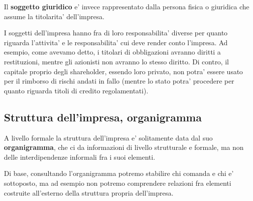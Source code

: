 \documentclass[a4paper,11pt]{article}
\begin{document}
Il \textbf{soggetto giuridico} e' invece rappresentato dalla persona fisica o giuridica che assume la titolarita' dell'impresa.

I soggetti dell'impresa hanno fra di loro responsabilita' diverse per quanto riguarda l'attivita' e le responsabilita' cui deve render conto l'impresa.
Ad esempio, come avevamo detto, i titolari di obbligazioni avranno diritti a restituzioni, mentre gli azionisti non avranno lo stesso diritto.
Di contro, il capitale proprio degli shareholder, essendo loro privato, non potra' essere usato per il rimborso di rischi andati in fallo (mentre lo stato potra' procedere per quanto riguarda titoli di credito regolamentati).

\subsection{Struttura dell'impresa, organigramma}
A livello formale la struttura dell'impresa e' solitamente data dal suo \textbf{organigramma}, che ci da informazioni di livello strutturale e formale, ma non delle interdipendenze informali fra i suoi elementi.
	
Di base, consultando l'organigramma potremo stabilire chi comanda e chi e' sottoposto, ma ad esempio non potremo comprendere relazioni fra elementi costruite all'esterno della struttura propria dell'impresa.
\end{document}
